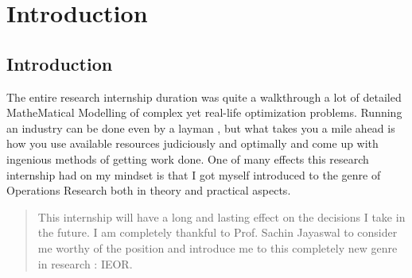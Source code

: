 \documentclass[11pt,fleqn]{book} %
\begin{document}

\pagestyle{empty} %

\tableofcontents %


\pagestyle{fancy} %



\chapter{Introduction}

\section{Introduction}
The entire research internship duration was quite a walkthrough a lot of detailed MatheMatical Modelling of complex yet real-life optimization problems. Running an industry can be done even by a layman , but what takes you a mile ahead is how you use available resources judiciously and optimally and come up with ingenious methods of getting work done. One of many effects this research internship had on my mindset is that I got myself introduced to the genre of Operations Research both in theory and practical aspects.
\begin{quote}
This internship will have a long and lasting effect on the decisions I take in the future. I am completely thankful to Prof. Sachin Jayaswal to consider me worthy of the position and introduce me to this completely new genre in research : IEOR.
\end{quote}
\end{document}
